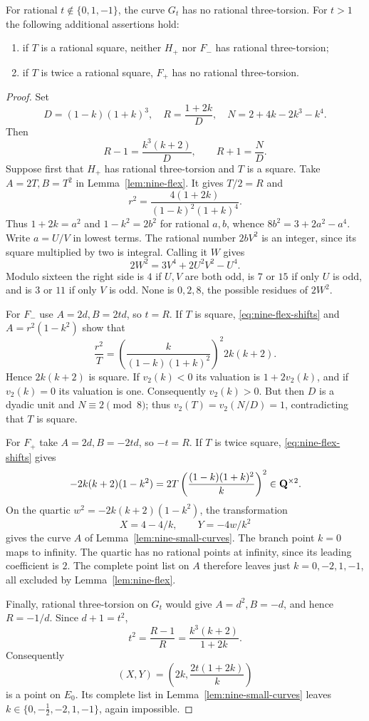 \begin{lemma}\label{lem:nine-three-torsion}
For rational $t\notin\{0,1,-1\}$, the curve $G_t$ has no rational
three-torsion.  For $t>1$ the following additional assertions hold:
\begin{enumerate}
\item if $T$ is a rational square, neither $H_+$ nor $F_-$ has
rational three-torsion;
\item if $T$ is twice a rational square, $F_+$ has no rational
three-torsion.
\end{enumerate}
\end{lemma}
\begin{proof}
Set
\[
 D=(1-k)(1+k)^3,\quad R=\frac{1+2k}{D},\quad
 N=2+4k-2k^3-k^4.
\]
Then
\begin{equation}\label{eq:nine-flex-shifts}
 R-1=\frac{k^3(k+2)}D,\qquad R+1=\frac ND.
\end{equation}
Suppose first that $H_+$ has rational three-torsion and $T$ is a
square.  Take $A=2T,B=T^2$ in Lemma~\ref{lem:nine-flex}.
It gives $T/2=R$ and
\[
 r^2=\frac{4(1+2k)}{(1-k)^2(1+k)^4}.
\]
Thus $1+2k=a^2$ and $1-k^2=2b^2$ for rational $a,b$, whence
$8b^2=3+2a^2-a^4$.  Write $a=U/V$ in lowest terms.  The rational
number $2bV^2$ is an integer, since its square multiplied by two is
integral.  Calling it $W$ gives
\[
 2W^2=3V^4+2U^2V^2-U^4.
\]
Modulo sixteen the right side is $4$ if $U,V$ are both odd, is
$7$ or $15$ if only $U$ is odd, and is $3$ or $11$ if only $V$
is odd.  None is $0,2,8$, the possible residues of $2W^2$.

For $F_-$ use $A=2d,B=2td$, so $t=R$.  If $T$ is square,
\eqref{eq:nine-flex-shifts} and $A=r^2(1-k^2)$ show that
\[
 \frac{r^2}T=
 \left(\frac{k}{(1-k)(1+k)^2}\right)^2 2k(k+2).
\]
Hence $2k(k+2)$ is square.  If $v_2(k)<0$ its valuation is
$1+2v_2(k)$, and if $v_2(k)=0$ its valuation is one.  Consequently
$v_2(k)>0$.  But then $D$ is a dyadic unit and $N\equiv2\pmod8$;
thus $v_2(T)=v_2(N/D)=1$, contradicting that $T$ is square.

For $F_+$ take $A=2d,B=-2td$, so $-t=R$.  If $T$ is twice square,
\eqref{eq:nine-flex-shifts} gives
\[
 -2k(k+2)(1-k^2)
 =2T\left(\frac{(1-k)(1+k)^2}{k}\right)^2\in\mathbf Q^{\times2}.
\]
On the quartic $w^2=-2k(k+2)(1-k^2)$, the transformation
\[
 X=4-4/k,\qquad Y=-4w/k^2
\]
gives the curve $A$ of Lemma~\ref{lem:nine-small-curves}.
The branch point $k=0$ maps to infinity.  The quartic has no rational
points at infinity, since its leading coefficient is $2$.
The complete point list on $A$ therefore leaves just
$k=0,-2,1,-1$, all excluded by Lemma~\ref{lem:nine-flex}.

Finally, rational three-torsion on $G_t$ would give
$A=d^2,B=-d$, and hence $R=-1/d$.  Since $d+1=t^2$,
\[
 t^2=\frac{R-1}R=\frac{k^3(k+2)}{1+2k}.
\]
Consequently
\[
 (X,Y)=\left(2k,\frac{2t(1+2k)}k\right)
\]
is a point on $E_0$.  Its complete list in
Lemma~\ref{lem:nine-small-curves} leaves
$k\in\{0,-\tfrac12,-2,1,-1\}$, again impossible.
\end{proof}

